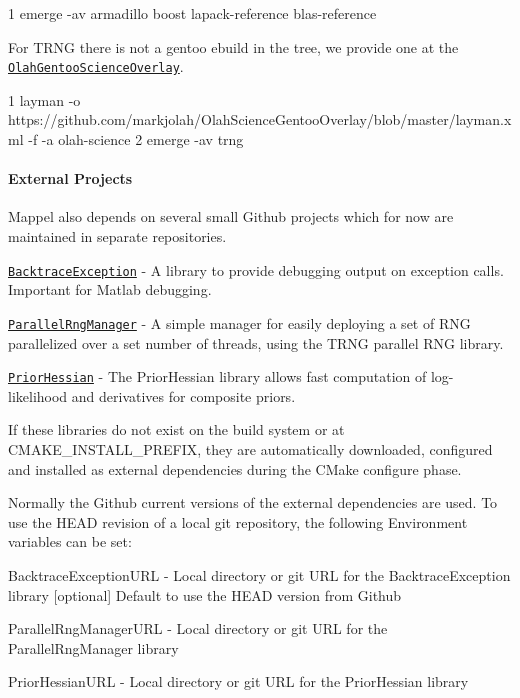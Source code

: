 \begin{DoxyCode}
1 emerge -av armadillo boost lapack-reference blas-reference
\end{DoxyCode}


For T\+R\+NG there is not a gentoo ebuild in the tree, we provide one at the \href{https://github.com/markjolah/OlahScienceGentooOverlay}{\tt Olah\+Gentoo\+Science\+Overlay}.


\begin{DoxyCode}
1 layman -o  https://github.com/markjolah/OlahScienceGentooOverlay/blob/master/layman.xml -f -a olah-science
2 emerge -av trng
\end{DoxyCode}


\paragraph*{External Projects}

Mappel also depends on several small Github projects which for now are maintained in separate repositories.


\begin{DoxyItemize}
\item \href{https://github.com/markjolah/BacktraceException}{\tt Backtrace\+Exception} -\/ A library to provide debugging output on exception calls. Important for Matlab debugging.
\item \href{https://github.com/markjolah/ParallelRngManager}{\tt Parallel\+Rng\+Manager} -\/ A simple manager for easily deploying a set of R\+NG parallelized over a set number of threads, using the T\+R\+NG parallel R\+NG library.
\item \href{https://github.com/markjolah/ParallelRngManager}{\tt Prior\+Hessian} -\/ The Prior\+Hessian library allows fast computation of log-\/likelihood and derivatives for composite priors.
\end{DoxyItemize}

If these libraries do not exist on the build system or at {\ttfamily C\+M\+A\+K\+E\+\_\+\+I\+N\+S\+T\+A\+L\+L\+\_\+\+P\+R\+E\+F\+IX}, they are automatically downloaded, configured and installed as external dependencies during the C\+Make configure phase.

Normally the Github current versions of the external dependencies are used. To use the H\+E\+AD revision of a local git repository, the following Environment variables can be set\+:


\begin{DoxyItemize}
\item {\ttfamily Backtrace\+Exception\+U\+RL} -\/ Local directory or git U\+RL for the Backtrace\+Exception library \mbox{[}optional\mbox{]} Default to use the H\+E\+AD version from Github
\item {\ttfamily Parallel\+Rng\+Manager\+U\+RL} -\/ Local directory or git U\+RL for the Parallel\+Rng\+Manager library
\item {\ttfamily Prior\+Hessian\+U\+RL} -\/ Local directory or git U\+RL for the Prior\+Hessian library
\end{DoxyItemize}

